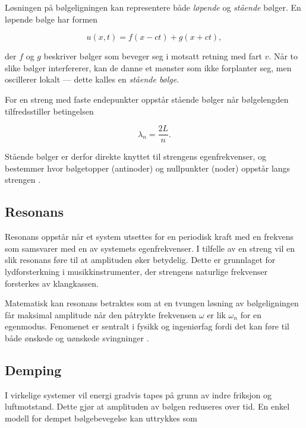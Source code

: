 Løsningen på bølgeligningen kan representere både \textit{løpende} og \textit{stående} bølger.  
En løpende bølge har formen

\begin{equation*}
u(x,t) = f(x - ct) + g(x + ct),
\end{equation*}

der $f$ og $g$ beskriver bølger som beveger seg i motsatt retning med fart $v$.  
Når to slike bølger interfererer, kan de danne et mønster som ikke forplanter seg, men oscillerer lokalt — dette kalles en \textit{stående bølge}.  

For en streng med faste endepunkter oppstår stående bølger når bølgelengden tilfredsstiller betingelsen

\begin{equation*}
\lambda_n = \frac{2L}{n}.
\end{equation*}

Stående bølger er derfor direkte knyttet til strengens egenfrekvenser, og bestemmer hvor bølgetopper (antinoder) og nullpunkter (noder) oppstår langs strengen \parencite{libretextsStandingWaves}.

\subsection{Resonans}

Resonans oppstår når et system utsettes for en periodisk kraft med en frekvens som samsvarer med en av systemets egenfrekvenser.  
I tilfelle av en streng vil en slik resonans føre til at amplituden øker betydelig.  
Dette er grunnlaget for lydforsterkning i musikkinstrumenter, der strengens naturlige frekvenser forsterkes av klangkassen.  

Matematisk kan resonans betraktes som at en tvungen løsning av bølgeligningen får maksimal amplitude når den påtrykte frekvensen $\omega$ er lik $\omega_n$ for en egenmodus.  
Fenomenet er sentralt i fysikk og ingeniørfag fordi det kan føre til både ønskede og uønskede svingninger \parencite{libretextsStringResonance}.

\subsection{Demping}

I virkelige systemer vil energi gradvis tapes på grunn av indre friksjon og luftmotstand.  
Dette gjør at amplituden av bølgen reduseres over tid.  
En enkel modell for dempet bølgebevegelse kan uttrykkes som

